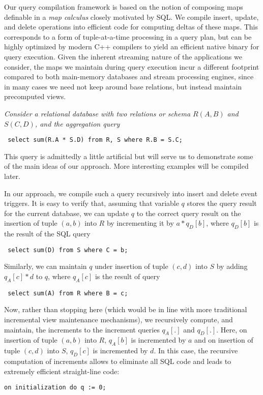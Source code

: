 Our query compilation framework is based on the notion of composing maps
definable in a {\em map calculus}\/ closely motivated by SQL.  We compile insert,
update, and delete operations into efficient code for computing deltas of these
maps. This corresponds to a form of tuple-at-a-time processing in a query plan,
but can be highly optimized by modern C++ compilers to yield an efficient native
binary for query execution.  Given the inherent streaming nature of the
applications we consider, the maps we maintain during query execution incur a
different footprint compared to both main-memory databases and stream processing
engines, since in many cases we need not keep around base relations, but instead
maintain precomputed views.



\begin{example}\em Consider a relational database with two relations or schema
$R(A,B)$ and $S(C,D)$, and the aggregation query
\begin{verbatim} select sum(R.A * S.D) from R, S where R.B = S.C;
\end{verbatim} This query is admittedly a little artificial but will serve us to
demonstrate some of the main ideas of our approach. More interesting examples
will be compiled later.

In our approach, we compile such a query recursively into insert and delete
event triggers.  It is easy to verify that, assuming that variable $q$ stores
the query result for the current database, we can update $q$ to the correct
query result on the insertion of tuple $(a,b)$ into $R$ by incrementing it by $a
* q_D[b]$, where $q_D[b]$ is the result of the SQL query
\begin{verbatim} select sum(D) from S where C = b;
\end{verbatim} Similarly, we can maintain $q$ under insertion of tuple $(c,d)$
into $S$ by adding $q_A[c] * d$ to $q$, where $q_A[c]$ is the result of query
\begin{verbatim} select sum(A) from R where B = c;
\end{verbatim} Now, rather than stopping here (which would be in line with more
traditional incremental view maintenance mechanisms), we recursively compute,
and maintain, the increments to the increment queries $q_A[.]$ and $q_D[.]$.
Here, on insertion of tuple $(a,b)$ into $R$, $q_A[b]$ is incremented by $a$ and
on insertion of tuple $(c,d)$ into $S$, $q_D[c]$ is incremented by $d$.  In this
case, the recursive computation of increments allows to eliminate all SQL code
and leads to extremely efficient straight-line code:
\begin{Verbatim}
on initialization do q := 0;


\end{Verbatim}
\end{example}
